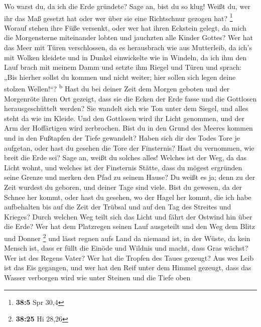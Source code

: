  Wo warst du, da ich die Erde gründete? Sage an, bist du
so klug!  Weißt du, wer ihr das Maß gesetzt hat oder wer
über sie eine Richtschnur gezogen hat? \footnote{\textbf{38:5} Spr 30,4}
 Worauf stehen ihre Füße versenkt, oder wer hat ihren
Eckstein gelegt,  da mich die Morgensterne miteinander
lobten und jauchzten alle Kinder Gottes?  Wer hat das Meer
mit Türen verschlossen, da es herausbrach wie aus Mutterleib,
 da ich's mit Wolken kleidete und in Dunkel einwickelte
wie in Windeln,  da ich ihm den Lauf brach mit meinem
Damm und setzte ihm Riegel und Türen  und sprach: „Bis
hierher sollst du kommen und nicht weiter; hier sollen sich legen deine
stolzen Wellen!{}``? \textsuperscript{b}  Hast du bei
deiner Zeit dem Morgen geboten und der Morgenröte ihren Ort gezeigt,
 dass sie die Ecken der Erde fasse und die Gottlosen
herausgeschüttelt werden?  Sie wandelt sich wie Ton unter
dem Siegel, und alles steht da wie im Kleide.  Und den
Gottlosen wird ihr Licht genommen, und der Arm der Hoffärtigen wird
zerbrochen.  Bist du in den Grund des Meeres kommen und
in den Fußtapfen der Tiefe gewandelt?  Haben sich dir des
Todes Tore je aufgetan, oder hast du gesehen die Tore der Finsternis?
 Hast du vernommen, wie breit die Erde sei? Sage an,
weißt du solches alles!  Welches ist der Weg, da das
Licht wohnt, und welches ist der Finsternis Stätte,  dass
du mögest ergründen seine Grenze und merken den Pfad zu seinem Hause?
 Du weißt es ja; denn zu der Zeit wurdest du geboren, und
deiner Tage sind viele.  Bist du gewesen, da der Schnee
her kommt, oder hast du gesehen, wo der Hagel her kommt, 
die ich habe aufbehalten bis auf die Zeit der Trübsal und auf den Tag
des Streites und Krieges?  Durch welchen Weg teilt sich
das Licht und fährt der Ostwind hin über die Erde?  Wer
hat dem Platzregen seinen Lauf ausgeteilt und den Weg dem Blitz und
Donner \footnote{\textbf{38:25} Hi 28,26}  und lässt
regnen aufs Land da niemand ist, in der Wüste, da kein Mensch ist,
 dass er füllt die Einöde und Wildnis und macht, dass
Gras wächst?  Wer ist des Regens Vater? Wer hat die
Tropfen des Taues gezeugt?  Aus wes Leib ist das Eis
gegangen, und wer hat den Reif unter dem Himmel gezeugt, 
dass das Wasser verborgen wird wie unter Steinen und die Tiefe oben
